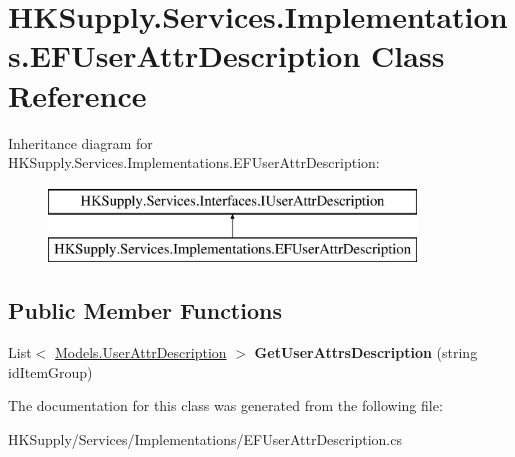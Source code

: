 \hypertarget{class_h_k_supply_1_1_services_1_1_implementations_1_1_e_f_user_attr_description}{}\section{H\+K\+Supply.\+Services.\+Implementations.\+E\+F\+User\+Attr\+Description Class Reference}
\label{class_h_k_supply_1_1_services_1_1_implementations_1_1_e_f_user_attr_description}
Inheritance diagram for H\+K\+Supply.\+Services.\+Implementations.\+E\+F\+User\+Attr\+Description\+:\begin{figure}[H]
\begin{center}
\leavevmode
\includegraphics[height=2.000000cm]{class_h_k_supply_1_1_services_1_1_implementations_1_1_e_f_user_attr_description}
\end{center}
\end{figure}
\subsection*{Public Member Functions}
\begin{DoxyCompactItemize}
\item 
\mbox{\label{class_h_k_supply_1_1_services_1_1_implementations_1_1_e_f_user_attr_description_a60a8125d27c5c353f3732cd724e8f0ad}} 
List$<$ \mbox{\hyperlink{class_h_k_supply_1_1_models_1_1_user_attr_description}{Models.\+User\+Attr\+Description}} $>$ {\bfseries Get\+User\+Attrs\+Description} (string id\+Item\+Group)
\end{DoxyCompactItemize}


The documentation for this class was generated from the following file\+:\begin{DoxyCompactItemize}
\item 
H\+K\+Supply/\+Services/\+Implementations/E\+F\+User\+Attr\+Description.\+cs\end{DoxyCompactItemize}
